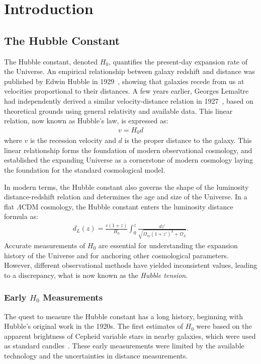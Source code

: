 \chapter{Introduction}
\label{chap:introduction}

\section{The Hubble Constant}
The Hubble constant, denoted $H_0$, quantifies the present-day expansion rate of the Universe. An empirical relationship between galaxy redshift and distance was published by Edwin Hubble in 1929~\citep{hubble1929}, showing that galaxies recede from us at velocities proportional to their distances. A few years earlier, Georges Lemaître had independently derived a similar velocity-distance relation in 1927~\citep{lemaitre1927univers}, based on theoretical grounds using general relativity and available data. This linear relation, now known as Hubble's law, is expressed as:
\begin{align}
    v = H_0 d
\end{align}
where $v$ is the recession velocity and $d$ is the proper distance to the galaxy. This linear relationship forms the foundation of modern observational cosmology, and established the expanding Universe as a cornerstone of modern cosmology laying the foundation for the standard cosmological model. 


In modern terms, the Hubble constant also governs the shape of the luminosity distance-redshift relation and determines the age and size of the Universe. In a flat $\Lambda$CDM cosmology, the Hubble constant enters the luminosity distance formula as:
\begin{align}
    d_L(z) = \frac{c(1+z)}{H_0} \int_0^z \frac{dz'}{\sqrt{\Omega_m(1+z')^3 + \Omega_\Lambda}}.
\end{align}
Accurate measurements of $H_0$ are essential for understanding the expansion history of the Universe and for anchoring other cosmological parameters. However, different observational methods have yielded inconsistent values, leading to a discrepancy, what is now known as the \textit{Hubble tension}.

\subsection{Early $H_0$ Measurements}
The quest to measure the Hubble constant has a long history, beginning with Hubble's original work in the 1920s. The first estimates of $H_0$ were based on the apparent brightness of Cepheid variable stars in nearby galaxies, which were used as standard candles~\citep{hubble1929}. These early measurements were limited by the available technology and the uncertainties in distance measurements.


